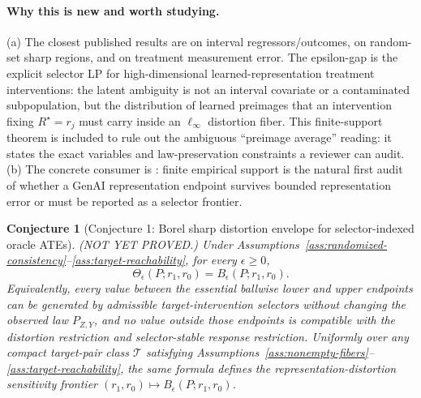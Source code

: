\documentclass[11pt]{article}
\theoremstyle{definition}
\theoremstyle{plain}
\newtheorem{conjecture}{Conjecture}
\theoremstyle{remark}
\begin{document}
\paragraph{Why this is new and worth studying.}
(a) The closest published results are \citet{ManskiTamer2002} on interval regressors/outcomes, \citet{BeresteanuMolchanovMolinari2011,BeresteanuMolchanovMolinari2012} on random-set sharp regions, and \citet{Ura2018} on treatment measurement error.  The epsilon-gap is the explicit selector LP for high-dimensional learned-representation treatment interventions: the latent ambiguity is not an interval covariate or a contaminated subpopulation, but the distribution of learned preimages that an intervention fixing \(R^\star=r_j\) must carry inside an \(\ell_\infty\) distortion fiber.  This finite-support theorem is included to rule out the ambiguous ``preimage average'' reading: it states the exact variables and law-preservation constraints a reviewer can audit.  (b) The concrete consumer is \citet{ImaiNakamura2024TextTreatments}: finite empirical support is the natural first audit of whether a GenAI representation endpoint survives bounded representation error or must be reported as a selector frontier.

\begin{conjecture}[Conjecture 1: Borel sharp distortion envelope for selector-indexed oracle ATEs]\label{conj:sharp-envelope}
(NOT YET PROVED.)  Under Assumptions~\ref{ass:randomized-consistency}--\ref{ass:target-reachability}, for every \(\epsilon\ge0\),
\[
\Theta_\epsilon(P;r_1,r_0)=B_\epsilon(P;r_1,r_0).
\]
Equivalently, every value between the essential ballwise lower and upper endpoints can be generated by admissible target-intervention selectors without changing the observed law \(P_{Z,Y}\), and no value outside those endpoints is compatible with the distortion restriction and selector-stable response restriction.  Uniformly over any compact target-pair class \(\mathcal T\) satisfying Assumptions~\ref{ass:nonempty-fibers}--\ref{ass:target-reachability}, the same formula defines the representation-distortion sensitivity frontier \((r_1,r_0)\mapsto B_\epsilon(P;r_1,r_0)\).
\end{conjecture}
\end{document}
